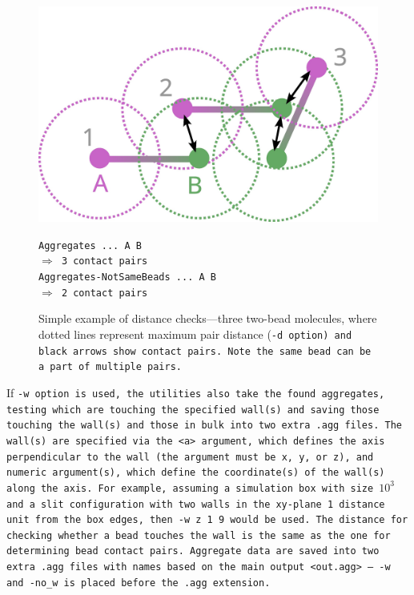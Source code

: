 \begin{figure}
  \centering
  \begin{minipage}{0.45\textwidth}
    \includegraphics[scale=0.6]{AggregateCheck.jpg}
  \end{minipage}
  \begin{minipage}{0.5\textwidth}
    \tt{Aggregates ... A B}\\
    \-\hspace{30pt}$\Rightarrow$ 3 contact pairs\\
    \tt{Aggregates-NotSameBeads ... A B}\\
    \-\hspace{30pt}$\Rightarrow$ 2 contact pairs\\
  \end{minipage}
  \caption{
    Simple example of distance checks---three two-bead molecules, where dotted
    lines represent maximum pair distance (\tt{-d} option) and black arrows show
    contact pairs. Note the same bead can be a part of multiple pairs.
  }
  \label{fig:AggCheck}
\end{figure}

If \tt{-w} option is used, the utilities also take the found aggregates, testing
which are touching the specified wall(s) and saving those touching the wall(s)
and those in bulk into two extra \tt{.agg} files. The wall(s) are specified via
the \tt{<a>} argument, which defines the axis perpendicular to the wall (the
argument must be \tt{x}, \tt{y}, or \tt{z}), and numeric argument(s), which
define the coordinate(s) of the wall(s) along the axis. For example, assuming a
simulation box with size $10^3$ and a slit configuration with two walls in the
xy-plane 1 distance unit from the box edges, then \tt{-w z 1 9} would be used.
The distance for checking whether a bead touches the wall is the same as the one
for determining bead contact pairs. Aggregate data are saved into two extra
\tt{.agg} files with names based on the main output \tt{<out.agg>} -- \tt{-w}
and \tt{-no_w} is placed before the \tt{.agg} extension.

